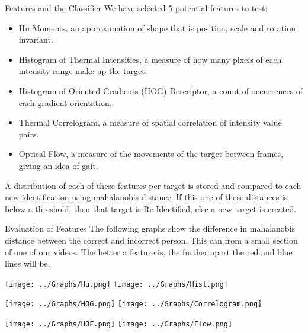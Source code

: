 \documentclass[final]{beamer}
\begin{document}
\begin{frame}{}
\begin{columns}[t]
\begin{column}{.49\linewidth}
        \begin{block}{Features and the Classifier}
        We have selected 5 potential features to test:
          \begin{itemize}
          \item Hu Moments, an approximation of shape that is position, scale and rotation invariant.
          \item Histogram of Thermal Intensities, a measure of how many pixels of each intensity range make up the target.
          \item Histogram of Oriented Gradients (HOG) Descriptor, a count of  occurrences of each gradient orientation. 
          \item Thermal Correlogram, a measure of spatial correlation of intensity value pairs.
          \item Optical Flow, a measure of the movements of the target between frames, giving an idea of gait. 
          \end{itemize}
          \justify
          A distribution of each of these features per target is stored and compared to each new identification using mahalanobis distance. If this one of these distances is below a threshold, then that target is Re-Identified, else a new target is created.
        \end{block}
	
        \begin{block}{Evaluation of Features}
        The following graphs show the difference in mahalanobis distance between the correct and incorrect person. This can from a small section of one of our videos. The better a feature is, the further apart the red and blue lines will be. 
        
        \hspace{1cm}
		\texttt{[image: ../Graphs/Hu.png]}
		\hspace{2cm}
		\texttt{[image: ../Graphs/Hist.png]}
		
		\hspace{1cm}
		\texttt{[image: ../Graphs/HOG.png]}
		\hspace{2cm}
		\texttt{[image: ../Graphs/Correlogram.png]}
		
		\hspace{1cm}
		\texttt{[image: ../Graphs/HOF.png]}
		\hspace{2cm}
		\texttt{[image: ../Graphs/Flow.png]}
		

\end{block}
\end{column}
\end{columns}
\end{frame}
\end{document}
